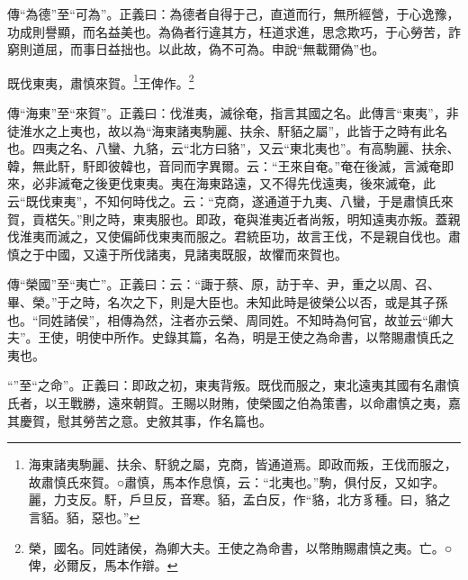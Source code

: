 {\noindent\shu{}\fzkt 傳“為德”至“可為”。正義曰：為德者自得于己，直道而行，無所經營，于心逸豫，功成則譽顯，而名益美也。為偽者行違其方，枉道求進，思念欺巧，于心勞苦，詐窮則道屈，而事日益拙也。以此故，偽不可為。申說“無載爾偽”也。 \par}

既伐東夷，肅慎來賀。\footnote{海東諸夷駒麗、扶余、馯貌之屬，克商，皆通道焉。即政而叛，王伐而服之，故肅慎氏來賀。○肅慎，馬本作息慎，云：“北夷也。”駒，俱付反，又如字。麗，力支反。馯，戶旦反，音寒。貊，孟白反，作“貉，北方豸種。曰，貉之言貊。貊，惡也。”}王俾作。\footnote{榮，國名。同姓諸侯，為卿大夫。王使之為命書，以幣賄賜肅慎之夷。亡。○俾，必爾反，馬本作辯。}


{\noindent\zhuan{}\fzbyks 傳“海東”至“來賀”。正義曰：伐淮夷，滅徐奄，指言其國之名。此傳言“東夷”，非徒淮水之上夷也，故以為“海東諸夷駒麗、扶余、馯貊之屬”，此皆于之時有此名也。四夷之名、八蠻、九貉，云“北方曰貉”，又云“東北夷也”。有高駒麗、扶余、韓，無此馯，馯即彼韓也，音同而字異爾。云：“王來自奄。”奄在後滅，言滅奄即來，必非滅奄之後更伐東夷。夷在海東路遠，又不得先伐遠夷，後來滅奄，此云“既伐東夷”，不知何時伐之。云：“克商，遂通道于九夷、八蠻，于是肅慎氏來賀，貢楛矢。”則之時，東夷服也。即政，奄與淮夷近者尚叛，明知遠夷亦叛。蓋親伐淮夷而滅之，又使偏師伐東夷而服之。君統臣功，故言王伐，不是親自伐也。肅慎之于中國，又遠于所伐諸夷，見諸夷既服，故懼而來賀也。 \par}

{\noindent\zhuan{}\fzbyks 傳“榮國”至“夷亡”。正義曰：云：“諏于蔡、原，訪于辛、尹，重之以周、召、畢、榮。”于之時，名次之下，則是大臣也。未知此時是彼榮公以否，或是其子孫也。“同姓諸侯”，相傳為然，注者亦云榮、周同姓。不知時為何官，故並云“卿大夫”。王使，明使中所作。史錄其篇，名為，明是王使之為命書，以幣賜肅慎氏之夷也。 \par}

{\noindent\shu{}\fzkt “”至“之命”。正義曰：即政之初，東夷背叛。既伐而服之，東北遠夷其國有名肅慎氏者，以王戰勝，遠來朝賀。王賜以財賄，使榮國之伯為策書，以命肅慎之夷，嘉其慶賀，慰其勞苦之意。史敘其事，作名篇也。 \par}

